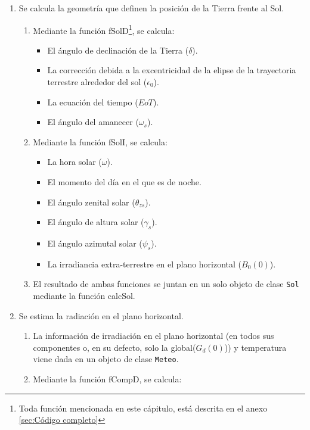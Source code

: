 \begin{enumerate}
\item Se calcula la geometría que definen la posición de la Tierra frente al Sol.
\begin{enumerate}
\item Mediante la función fSolD\footnote{Toda función mencionada en este cápitulo, está descrita en el anexo \ref{sec:Código completo}}, se calcula:
\begin{itemize}
\item El ángulo de declinación de la Tierra (\(\delta\)).
\item La corrección debida a la excentricidad de la elipse de la trayectoria terrestre alrededor del sol (\(\epsilon_0\)).
\item La ecuación del tiempo (\(EoT\)).
\item El ángulo del amanecer (\(\omega_s\)).
\end{itemize}
\item Mediante la función fSolI, se calcula:
\begin{itemize}
\item La hora solar (\(\omega\)).
\item El momento del día en el que es de noche.
\item El ángulo zenital solar (\(\theta_{zs}\)).
\item El ángulo de altura solar (\(\gamma_s\)).
\item El ángulo azimutal solar (\(\psi_s\)).
\item La irradiancia extra-terrestre en el plano horizontal (\(B_0(0)\)).
\end{itemize}
\item El resultado de ambas funciones se juntan en un solo objeto de clase \texttt{Sol} mediante la función calcSol.
\end{enumerate}
\item Se estima la radiación en el plano horizontal.
\begin{enumerate}
\item La información de irradiación en el plano horizontal (en todos sus componentes o, en su defecto, solo la global(\(G_d(0)\))) y temperatura viene dada en un objeto de clase \texttt{Meteo}.
\item Mediante la función fCompD, se calcula:
\begin{itemize}

\end{itemize}
\end{enumerate}
\end{enumerate}
